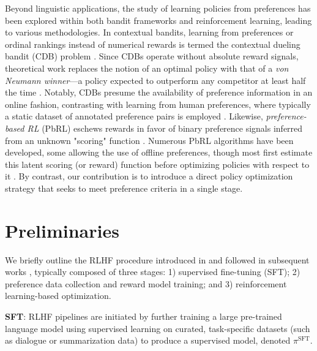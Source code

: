 Beyond linguistic applications, the study of learning policies from preferences has been explored within both bandit frameworks and reinforcement learning, leading to various methodologies. In contextual bandits, learning from preferences or ordinal rankings instead of numerical rewards is termed the contextual dueling bandit (CDB) problem \citep{yue2012karmed,dudik2015contextual}. Since CDBs operate without absolute reward signals, theoretical work replaces the notion of an optimal policy with that of a \textit{von Neumann winner}—a policy expected to outperform any competitor at least half the time \citep{dudik2015contextual}. Notably, CDBs presume the availability of preference information in an online fashion, contrasting with learning from human preferences, where typically a static dataset of annotated preference pairs is employed \citep{yan2022human}. Likewise, \textit{preference-based RL} (PbRL) eschews rewards in favor of binary preference signals inferred from an unknown "scoring" function \citep{BusaFekete2014,ruiz2023dueling}. Numerous PbRL algorithms have been developed, some allowing the use of offline preferences, though most first estimate this latent scoring (or reward) function before optimizing policies with respect to it \citep{jain2013learning,BusaFekete2014,christiano2017deep,sadigh2017active,kupcsik2018learning}. By contrast, our contribution is to introduce a direct policy optimization strategy that seeks to meet preference criteria in a single stage.

\section{Preliminaries}\label{section:prelims}

We briefly outline the RLHF procedure introduced in \citeauthor{ziegler2020finetuning} and followed in subsequent works \citep{stiennon2022learning, bai2022training, ouyang2022training}, typically composed of three stages: 1) supervised fine-tuning (SFT); 2) preference data collection and reward model training; and 3) reinforcement learning-based optimization.

\textbf{SFT}: RLHF pipelines are initiated by further training a large pre-trained language model using supervised learning on curated, task-specific datasets (such as dialogue or summarization data) to produce a supervised model, denoted $\pi^\text{SFT}$.

